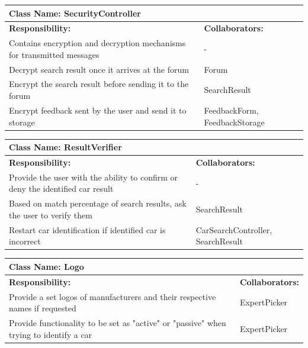 \documentclass[12pt]{article}
\begin{document}
	\begin{table}[ht]
		\centering
		\begin{tabular}{|p{5cm}|p{5cm}|}
			\hline
			\multicolumn{2}{|l|}{\textbf{Class Name:} SecurityController} \\
			\hline
			\textbf{Responsibility:} & \textbf{Collaborators:} \\
			\hline
			Contains encryption and decryption mechanisms for transmitted messages & -\\
			\hline
			Decrypt search result once it arrives at the forum & Forum\\
			\hline
			Encrypt the search result before sending it to the forum & SearchResult\\
			\hline
			Encrypt feedback sent by the user and send it to storage & FeedbackForm, FeedbackStorage\\
			\hline
		\end{tabular}
	\end{table}

	\begin{table}[ht]
		\centering
		\begin{tabular}{|p{5cm}|p{5cm}|}
			\hline
			\multicolumn{2}{|l|}{\textbf{Class Name:} ResultVerifier} \\
			\hline
			\textbf{Responsibility:} & \textbf{Collaborators:} \\
			\hline
			Provide the user with the ability to confirm or deny the identified car result & -\\
			\hline
			Based on match percentage of search results, ask the user to verify them & SearchResult\\
			\hline
			Restart car identification if identified car is incorrect & CarSearchController, SearchResult\\
			\hline
		\end{tabular}
	\end{table}
	
	\begin{table}[ht]
		\centering
		\begin{tabular}{|p{5cm}|p{5cm}|}
			\hline
			\multicolumn{2}{|l|}{\textbf{Class Name:} Logo} \\
			\hline
			\textbf{Responsibility:} & \textbf{Collaborators:} \\
			\hline
			Provide a set logos of manufacturers and their respective names if requested & ExpertPicker\\
			\hline
			Provide functionality to be set as "active" or "passive" when trying to identify a car & ExpertPicker\\
			\hline
		\end{tabular}
	\end{table}
	
\end{document}
